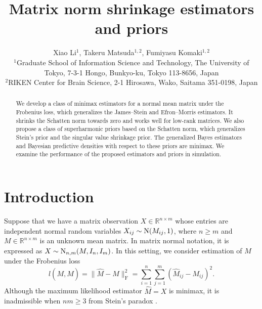 \documentclass[11pt, a4paper]{article}
\theoremstyle{remark}
\begin{document}
\title{Matrix norm shrinkage estimators and priors}

\author{%
	Xiao Li$^{1}$,
	Takeru Matsuda$^{1,2}$,
	Fumiyasu Komaki$^{1,2}$\\
	\small $^{1}$Graduate School of Information Science and Technology,
	The University of Tokyo,
	7-3-1 Hongo, Bunkyo-ku, Tokyo 113-8656, Japan\\
	\small $^{2}$RIKEN Center for Brain Science,
	2-1 Hirosawa, Wako, Saitama 351-0198, Japan
}

\date{}

\maketitle

\begin{abstract}%
We develop a class of minimax estimators for a normal mean matrix under the Frobenius loss, which generalizes the James--Stein and Efron--Morris estimators.
It shrinks the Schatten norm towards zero and works well for low-rank matrices.
We also propose a class of superharmonic  priors based on the Schatten norm, which generalizes Stein's prior and the singular value shrinkage prior. 
The generalized Bayes estimators and Bayesian predictive densities with respect to these priors are minimax.
We examine the performance of the proposed estimators and priors in simulation.
\end{abstract}

\section{Introduction}
Suppose that we have a matrix observation $X \in \mathbb{R}^{n \times m}$ whose entries are independent normal random variables $X_{ij} \sim {\rm N} (M_{ij},1)$, where $n \geq m$ and $M \in \mathbb{R}^{n \times m}$ is an unknown mean matrix. 	
In matrix normal notation, it is expressed as $X \sim {\rm N}_{n,m} (M,I_n,I_m)$.
In this setting, we consider estimation of $M$ under the Frobenius loss
\[
    l(M,\hat{M}) = \| \hat{M}-M \|_{\mathrm{F}}^2 = \sum_{i=1}^n \sum_{j=1}^m (\hat{M}_{ij}-M_{ij})^2.
\]
Although the maximum likelihood estimator $\hat{M}=X$ is minimax, it is inadmissible when $nm \geq 3$ from Stein's paradox \citep{stein1974estimation}.
\end{document}

